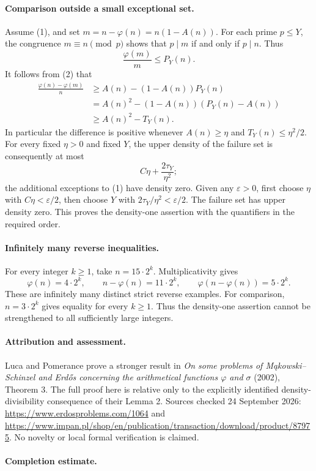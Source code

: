 \paragraph{Comparison outside a small exceptional set.}
Assume (1), and set \(m=n-\varphi(n)=n(1-A(n))\).
For each prime \(p\leq Y\), the congruence \(m\equiv n\pmod p\) shows that \(p\mid m\) if and only if \(p\mid n\). Thus
\[
 \frac{\varphi(m)}m\leq P_Y(n).
\]
It follows from (2) that
\[
\begin{split}
 \frac{\varphi(n)-\varphi(m)}n
 &\geq A(n)-(1-A(n))P_Y(n)\\
 &=A(n)^2-(1-A(n))(P_Y(n)-A(n))\\
 &\geq A(n)^2-T_Y(n).
\end{split}
 \tag{5}
\]
In particular the difference is positive whenever \(A(n)\geq\eta\) and \(T_Y(n)\leq\eta^2/2\).
For every fixed \(\eta>0\) and fixed \(Y\), the upper density of the failure set is consequently at most
\[
 C\eta+\frac{2\tau_Y}{\eta^2};
\]
the additional exceptions to (1) have density zero. Given any \(\varepsilon>0\), first choose \(\eta\) with \(C\eta<\varepsilon/2\), then choose \(Y\) with \(2\tau_Y/\eta^2<\varepsilon/2\). The failure set has upper density zero. This proves the density-one assertion with the quantifiers in the required order.

\paragraph{Infinitely many reverse inequalities.}
For every integer \(k\geq1\), take \(n=15\cdot2^k\). Multiplicativity gives
\[
 \varphi(n)=4\cdot2^k,\qquad
 n-\varphi(n)=11\cdot2^k,\qquad
 \varphi(n-\varphi(n))=5\cdot2^k.
\]
These are infinitely many distinct strict reverse examples. For comparison, \(n=3\cdot2^k\) gives equality for every \(k\geq1\). Thus the density-one assertion cannot be strengthened to all sufficiently large integers.

\paragraph{Attribution and assessment.}
Luca and Pomerance prove a stronger result in \emph{On some problems of M\k{a}kowski--Schinzel and Erd\H{o}s concerning the arithmetical functions \(\varphi\) and \(\sigma\)} (2002), Theorem 3. The full proof here is relative only to the explicitly identified density-divisibility consequence of their Lemma 2. Sources checked 24 September 2026: \url{https://www.erdosproblems.com/1064} and \url{https://www.impan.pl/shop/en/publication/transaction/download/product/87975}. No novelty or local formal verification is claimed.

\paragraph{Completion estimate.}
